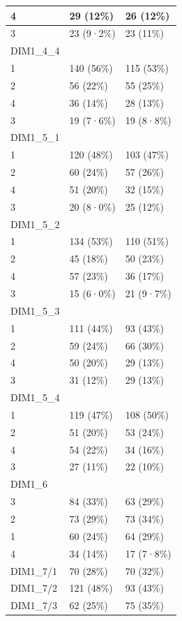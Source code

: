 \documentclass[
]{book}
\begin{document}
\begin{tabular}{l|l|l}
\hline
4 & 29 (12\%) & 26 (12\%)\\
\hline
3 & 23 (9·2\%) & 23 (11\%)\\
\hline
DIM1\_4\_4 &  & \\
\hline
1 & 140 (56\%) & 115 (53\%)\\
\hline
2 & 56 (22\%) & 55 (25\%)\\
\hline
4 & 36 (14\%) & 28 (13\%)\\
\hline
3 & 19 (7·6\%) & 19 (8·8\%)\\
\hline
DIM1\_5\_1 &  & \\
\hline
1 & 120 (48\%) & 103 (47\%)\\
\hline
2 & 60 (24\%) & 57 (26\%)\\
\hline
4 & 51 (20\%) & 32 (15\%)\\
\hline
3 & 20 (8·0\%) & 25 (12\%)\\
\hline
DIM1\_5\_2 &  & \\
\hline
1 & 134 (53\%) & 110 (51\%)\\
\hline
2 & 45 (18\%) & 50 (23\%)\\
\hline
4 & 57 (23\%) & 36 (17\%)\\
\hline
3 & 15 (6·0\%) & 21 (9·7\%)\\
\hline
DIM1\_5\_3 &  & \\
\hline
1 & 111 (44\%) & 93 (43\%)\\
\hline
2 & 59 (24\%) & 66 (30\%)\\
\hline
4 & 50 (20\%) & 29 (13\%)\\
\hline
3 & 31 (12\%) & 29 (13\%)\\
\hline
DIM1\_5\_4 &  & \\
\hline
1 & 119 (47\%) & 108 (50\%)\\
\hline
2 & 51 (20\%) & 53 (24\%)\\
\hline
4 & 54 (22\%) & 34 (16\%)\\
\hline
3 & 27 (11\%) & 22 (10\%)\\
\hline
DIM1\_6 &  & \\
\hline
3 & 84 (33\%) & 63 (29\%)\\
\hline
2 & 73 (29\%) & 73 (34\%)\\
\hline
1 & 60 (24\%) & 64 (29\%)\\
\hline
4 & 34 (14\%) & 17 (7·8\%)\\
\hline
DIM1\_7/1 & 70 (28\%) & 70 (32\%)\\
\hline
DIM1\_7/2 & 121 (48\%) & 93 (43\%)\\
\hline
DIM1\_7/3 & 62 (25\%) & 75 (35\%)\\

\end{tabular}
\end{document}
